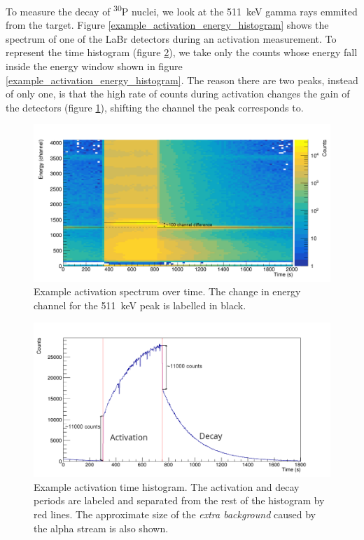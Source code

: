 \documentclass[a4paper,12pt]{report}
\newcommand{\Piso}{\textsuperscript{30}P }
\begin{document}
To measure the decay of \Piso nuclei, we look at the \qty{511}{\keV} gamma rays emmited from the target.
Figure \ref{example_activation_energy_histogram} shows the spectrum of one of the LaBr detectors during an activation measurement.
To represent the time histogram (figure \ref{example_activation_time_histogram}), we take only the counts whose energy fall inside the energy window shown in figure \ref{example_activation_energy_histogram}.
The reason there are two peaks, instead of only one, is that the high rate of counts during activation changes the gain of the detectors (figure \ref{example_activation_energytime}), shifting the channel the peak corresponds to.

\begin{figure}[H]
	\centering
	\includegraphics[width=\textwidth]{example_activation_energytime.png}
	\caption{Example activation spectrum over time.
	The change in energy channel for the \qty{511}{\keV} peak is labelled in black.}
	\label{example_activation_energytime}
\end{figure}

\begin{figure}[H]
	\centering
	\includegraphics[width=\textwidth]{example_activation_time_histogram.png}
	\caption{Example activation time histogram.
	The activation and decay periods are labeled and separated from the rest of the histogram by red lines.
	The approximate size of the \textit{extra background} caused by the alpha stream is also shown.}
	\label{example_activation_time_histogram}
\end{figure}
\end{document}
